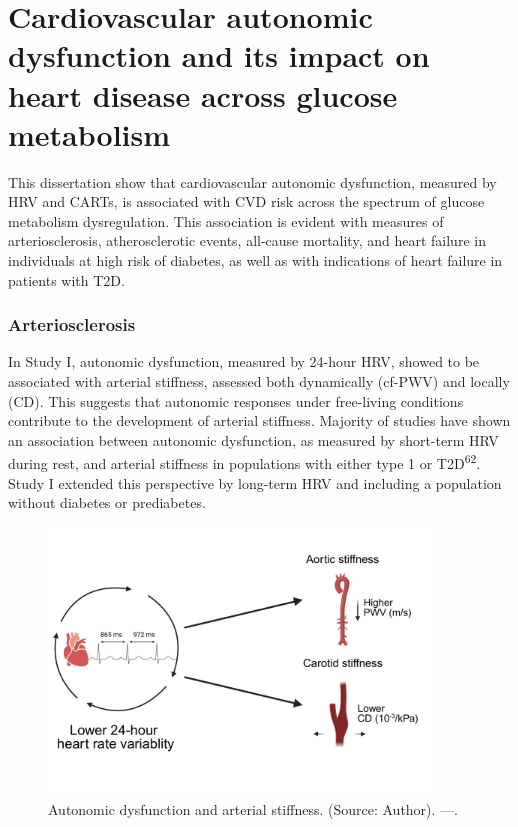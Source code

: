 \documentclass[
  a4paper,
  headsepline=true,
  open=any]{scrbook}
\begin{document}
\hypertarget{cardiovascular-autonomic-dysfunction-and-its-impact-on-heart-disease-across-glucose-metabolism}{%
\section{Cardiovascular autonomic dysfunction and its impact on heart
disease across glucose
metabolism}\label{cardiovascular-autonomic-dysfunction-and-its-impact-on-heart-disease-across-glucose-metabolism}}

This dissertation show that cardiovascular autonomic dysfunction,
measured by HRV and CARTs, is associated with CVD risk across the
spectrum of glucose metabolism dysregulation. This association is
evident with measures of arteriosclerosis, atherosclerotic events,
all-cause mortality, and heart failure in individuals at high risk of
diabetes, as well as with indications of heart failure in patients with
T2D.

\hypertarget{arteriosclerosis-1}{%
\subsubsection{Arteriosclerosis}\label{arteriosclerosis-1}}

In Study I, autonomic dysfunction, measured by 24-hour HRV, showed to be
associated with arterial stiffness, assessed both dynamically (cf-PWV)
and locally (CD). This suggests that autonomic responses under
free-living conditions contribute to the development of arterial
stiffness. Majority of studies have shown an association between
autonomic dysfunction, as measured by short-term HRV during rest, and
arterial stiffness in populations with either type 1 or
T2D\textsuperscript{62}. Study I extended this perspective by long-term
HRV and including a population without diabetes or prediabetes.

\begin{figure}

{\centering \includegraphics[width=4in,height=\textheight]{images/hrv_arterial_stiffness.pdf}

}

\caption{Autonomic dysfunction and arterial stiffness. (Source: Author).
---.}

\end{figure}
\end{document}
